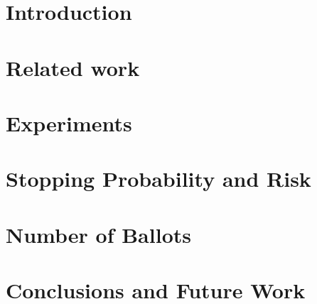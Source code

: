 \documentclass[runningheads]{llncs}
\begin{document}
\section{Introduction}
\label{sec:intro}


\section{Related work}
\label{sec:related}


%

\section{Experiments}
\label{sec:expts}


\section{Stopping Probability and Risk}
\label{sec:results1}


\section{Number of Ballots}
\label{sec:results2}


\section{Conclusions and Future Work}
\label{sec:conc}




%
%
%


%
\end{document}
